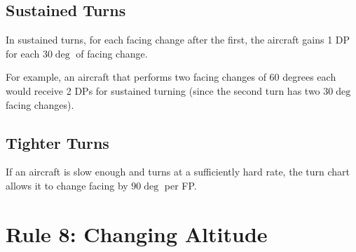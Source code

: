 \documentclass[10pt]{extarticle}
\begin{document}
\subsection{Sustained Turns} In sustained turns, for each facing change after the first, the aircraft gains 1 DP for each $30\deg$ of facing change. 

For example, an aircraft that performs two facing changes of 60 degrees each would receive 2 DPs for sustained turning (since the second turn has two $30\deg$ facing changes).

\subsection{Tighter Turns} If an aircraft is slow enough and turns at a sufficiently hard rate, the turn chart allows it to change facing by $90\deg$ per FP. 

\section{Rule 8: Changing Altitude}
\end{document}
